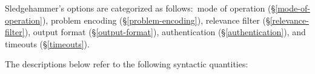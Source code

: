 \documentclass[a4paper,12pt]{article}
\def\qtybf#1{$\mathbf{\left<\textbf{\textit{#1\/}}\right>}$}
\begin{document}
\def\flushitem#1{\item[]\noindent\kern-\leftmargin \textbf{#1}}
\def\optrueonly#1{\flushitem{\textit{#1} $\bigl[$= \textit{true}$\bigr]$\enskip}\nopagebreak\\[\parskip]}
\def\optrue#1#2{\flushitem{\textit{#1} $\bigl[$= \qtybf{bool}$\bigr]$\enskip \defl\textit{true}\defr\hfill (neg.: \textit{#2})}\nopagebreak\\[\parskip]}
\def\opfalse#1#2{\flushitem{\textit{#1} $\bigl[$= \qtybf{bool}$\bigr]$\enskip \defl\textit{false}\defr\hfill (neg.: \textit{#2})}\nopagebreak\\[\parskip]}
\def\opsmart#1#2{\flushitem{\textit{#1} $\bigl[$= \qtybf{smart\_bool}$\bigr]$\enskip \defl\textit{smart}\defr\hfill (neg.: \textit{#2})}\nopagebreak\\[\parskip]}
\def\opsmartx#1#2{\flushitem{\textit{#1} $\bigl[$= \qtybf{smart\_bool}$\bigr]$\enskip \defl\textit{smart}\defr\\\hbox{}\hfill (neg.: \textit{#2})}\nopagebreak\\[\parskip]}
\def\opnodefault#1#2{\flushitem{\textit{#1} = \qtybf{#2}} \nopagebreak\\[\parskip]}
\def\opnodefaultbrk#1#2{\flushitem{$\bigl[$\textit{#1} =$\bigr]$ \qtybf{#2}} \nopagebreak\\[\parskip]}
\def\opdefault#1#2#3{\flushitem{\textit{#1} = \qtybf{#2}\enskip \defl\textit{#3}\defr} \nopagebreak\\[\parskip]}
\def\oparg#1#2#3{\flushitem{\textit{#1} \qtybf{#2} = \qtybf{#3}} \nopagebreak\\[\parskip]}
\def\opargbool#1#2#3{\flushitem{\textit{#1} \qtybf{#2} $\bigl[$= \qtybf{bool}$\bigr]$\hfill (neg.: \textit{#3})}\nopagebreak\\[\parskip]}
\def\opargboolorsmart#1#2#3{\flushitem{\textit{#1} \qtybf{#2} $\bigl[$= \qtybf{smart\_bool}$\bigr]$\hfill (neg.: \textit{#3})}\nopagebreak\\[\parskip]}

Sledgehammer's options are categorized as follows:\ mode of operation
(\S\ref{mode-of-operation}), problem encoding (\S\ref{problem-encoding}),
relevance filter (\S\ref{relevance-filter}), output format
(\S\ref{output-format}), authentication (\S\ref{authentication}), and timeouts
(\S\ref{timeouts}).

The descriptions below refer to the following syntactic quantities:
\end{document}
